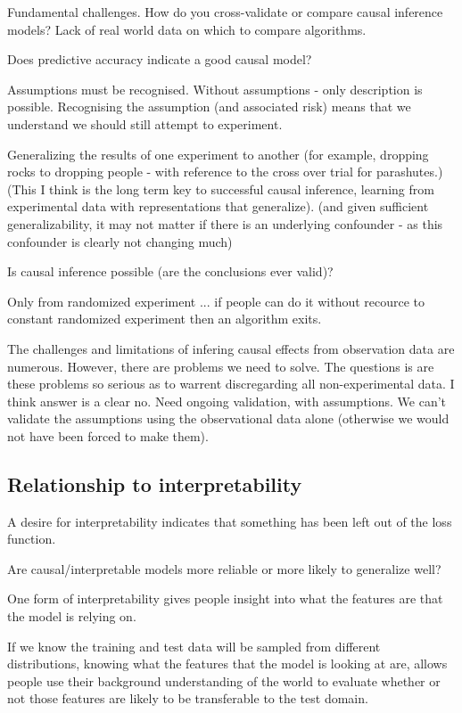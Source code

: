 \documentclass[11pt,a4paper,oneside]{book}
\begin{document}
Fundamental challenges. How do you cross-validate or compare causal inference models? Lack of real world data on which to compare algorithms. 

Does predictive accuracy indicate a good causal model?

Assumptions must be recognised. Without assumptions - only description is possible. Recognising the assumption (and associated risk) means that we understand we should still attempt to experiment.

Generalizing the results of one experiment to another (for example, dropping rocks to dropping people - with reference to the cross over trial for parashutes.) (This I think is the long term key to successful causal inference, learning from experimental data with representations that generalize). (and given sufficient generalizability, it may not matter if there is an underlying confounder - as this confounder is clearly not changing much)

Is causal inference possible (are the conclusions ever valid)?

Only from randomized experiment ... if people can do it without recource to constant randomized experiment then an algorithm exits.

The challenges and limitations of infering causal effects from observation data are numerous. However, there are problems we need to solve. The questions is are these problems so serious as to warrent discregarding all non-experimental data. I think answer is a clear no. Need ongoing validation, with assumptions. We can't validate the assumptions using the observational data alone (otherwise we would not have been forced to make them).


\subsection*{Relationship to interpretability}

A desire for interpretability indicates that something has been left out of the loss function. 

Are causal/interpretable models more reliable or more likely to generalize well? 

One form of interpretability gives people insight into what the features are that the model is relying on. 

If we know the training and test data will be sampled from different distributions, knowing what the features that the model is looking at are, allows people use their background understanding of the world to evaluate whether or not those features are likely to be transferable to the test domain. 
\end{document}
